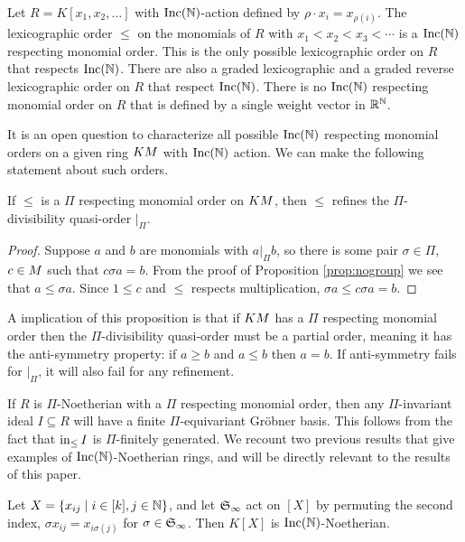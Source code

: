 \begin{example}
 Let $R = K[x_1,x_2,\ldots]$ with $\operatorname{Inc}(\mathbb N)$-action defined by $\rho \cdot x_i = x_{\rho(i)}$.  The lexicographic order $\leq$ on the monomials of $R$ with $x_1 < x_2 < x_3 < \cdots$ is a $\operatorname{Inc}(\mathbb N)$ respecting monomial order.  This is the only possible lexicographic order on $R$ that respects $\operatorname{Inc}(\mathbb N)$.  There are also a graded lexicographic and a graded reverse lexicographic order on $R$ that respect $\operatorname{Inc}(\mathbb N)$.  There is no $\operatorname{Inc}(\mathbb N)$ respecting monomial order on $R$ that is defined by a single weight vector in $\mathbb R^{\mathbb N}$.
\end{example}

It is an open question to characterize all possible $\operatorname{Inc}(\mathbb N)$ respecting monomial orders on a given ring $KM$ with $\operatorname{Inc}(\mathbb N)$ action.  We can make the following statement about such orders.

\begin{proposition}
 If $\leq$ is a $\Pi$ respecting monomial order on $KM$, then $\leq$ refines the $\Pi$-divisibility quasi-order $|_\Pi$.
\end{proposition}
\begin{proof}
 Suppose $a$ and $b$ are monomials with $a |_\Pi b$, so there is some pair $\sigma \in \Pi$, $c \in M$ such that $c\sigma a = b$.  From the proof of Proposition \ref{prop:nogroup} we see that $a \leq \sigma a$.  Since $1 \leq c$ and $\leq$ respects multiplication, $\sigma a \leq c\sigma a = b$.
\end{proof}

A implication of this proposition is that if $KM$ has a $\Pi$ respecting monomial order then the $\Pi$-divisibility quasi-order must be a partial order, meaning it has the anti-symmetry property: if $a \geq b$ and $a \leq b$ then $a = b$.  If anti-symmetry fails for $|_\Pi$, it will also fail for any refinement.

If $R$ is $\Pi$-Noetherian with a $\Pi$ respecting monomial order, then any $\Pi$-invariant ideal $I \subseteq R$ will have a finite $\Pi$-equivariant Gr\"obner basis.  This follows from the fact that $\operatorname{in}_{\leq} I$ is $\Pi$-finitely generated.  We recount two previous results that give examples of $\operatorname{Inc}(\mathbb N)$-Noetherian rings, and will be directly relevant to the results of this paper.

\begin{theorem}\label{thm:HS}
 Let $X = \{x_{ij} \mid i \in [k], j \in \mathbb N\}$, and let $\mathfrak S_\infty$ act on $[X]$ by permuting the second index, $\sigma x_{ij} = x_{i\sigma(j)}$ for $\sigma \in \mathfrak S_\infty$.  Then $K[X]$ is $\operatorname{Inc}(\mathbb N)$-Noetherian.
\end{theorem}

